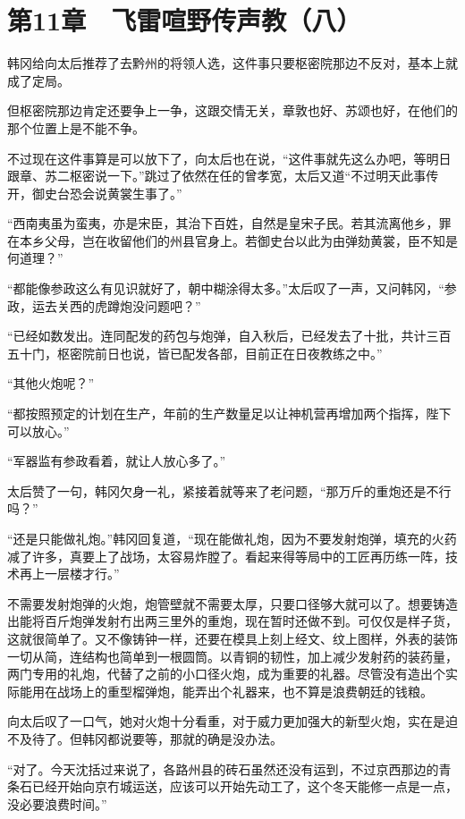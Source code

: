 \section{第11章　飞雷喧野传声教（八）}

韩冈给向太后推荐了去黔州的将领人选，这件事只要枢密院那边不反对，基本上就成了定局。

但枢密院那边肯定还要争上一争，这跟交情无关，章敦也好、苏颂也好，在他们的那个位置上是不能不争。

不过现在这件事算是可以放下了，向太后也在说，“这件事就先这么办吧，等明日跟章、苏二枢密说一下。”跳过了依然在任的曾孝宽，太后又道“不过明天此事传开，御史台恐会说黄裳生事了。”

“西南夷虽为蛮夷，亦是宋臣，其治下百姓，自然是皇宋子民。若其流离他乡，罪在本乡父母，岂在收留他们的州县官身上。若御史台以此为由弹劾黄裳，臣不知是何道理？”

“都能像参政这么有见识就好了，朝中糊涂得太多。”太后叹了一声，又问韩冈，“参政，运去关西的虎蹲炮没问题吧？”

“已经如数发出。连同配发的药包与炮弹，自入秋后，已经发去了十批，共计三百五十门，枢密院前日也说，皆已配发各部，目前正在日夜教练之中。”

“其他火炮呢？”

“都按照预定的计划在生产，年前的生产数量足以让神机营再增加两个指挥，陛下可以放心。”

“军器监有参政看着，就让人放心多了。”

太后赞了一句，韩冈欠身一礼，紧接着就等来了老问题，“那万斤的重炮还是不行吗？”

“还是只能做礼炮。”韩冈回复道，“现在能做礼炮，因为不要发射炮弹，填充的火药减了许多，真要上了战场，太容易炸膛了。看起来得等局中的工匠再历练一阵，技术再上一层楼才行。”

不需要发射炮弹的火炮，炮管壁就不需要太厚，只要口径够大就可以了。想要铸造出能将百斤炮弹发射冇出两三里外的重炮，现在暂时还做不到。可仅仅是样子货，这就很简单了。又不像铸钟一样，还要在模具上刻上经文、纹上图样，外表的装饰一切从简，连结构也简单到一根圆筒。以青铜的韧性，加上减少发射药的装药量，两门专用的礼炮，代替了之前的小口径火炮，成为重要的礼器。尽管没有造出个实际能用在战场上的重型榴弹炮，能弄出个礼器来，也不算是浪费朝廷的钱粮。

向太后叹了一口气，她对火炮十分看重，对于威力更加强大的新型火炮，实在是迫不及待了。但韩冈都说要等，那就的确是没办法。

“对了。今天沈括过来说了，各路州县的砖石虽然还没有运到，不过京西那边的青条石已经开始向京冇城运送，应该可以开始先动工了，这个冬天能修一点是一点，没必要浪费时间。”

